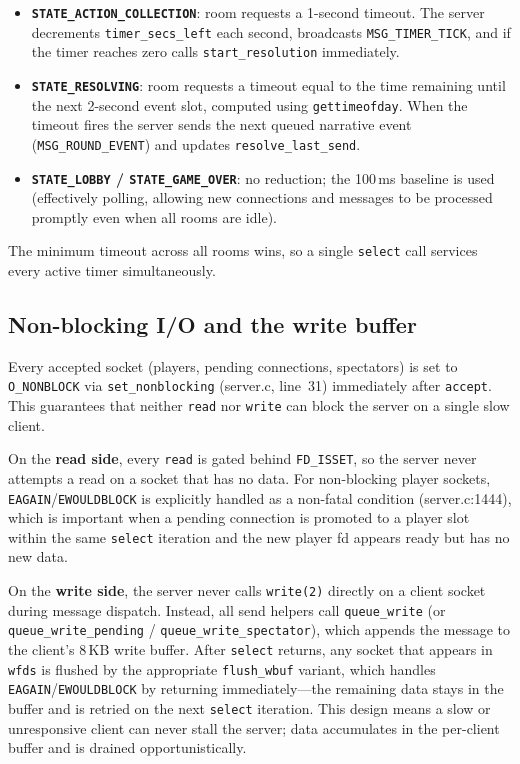 \documentclass[11pt,letterpaper]{article}
\begin{document}
\begin{itemize}[leftmargin=2em]
    \item \textbf{\texttt{STATE\_ACTION\_COLLECTION}}: room requests a 1-second timeout. The server decrements \texttt{timer\_secs\_left} each second, broadcasts \texttt{MSG\_TIMER\_TICK}, and if the timer reaches zero calls \texttt{start\_resolution} immediately.
    \item \textbf{\texttt{STATE\_RESOLVING}}: room requests a timeout equal to the time remaining until the next 2-second event slot, computed using \texttt{gettimeofday}. When the timeout fires the server sends the next queued narrative event (\texttt{MSG\_ROUND\_EVENT}) and updates \texttt{resolve\_last\_send}.
    \item \textbf{\texttt{STATE\_LOBBY} / \texttt{STATE\_GAME\_OVER}}: no reduction; the 100\,ms baseline is used (effectively polling, allowing new connections and messages to be processed promptly even when all rooms are idle).
\end{itemize}

The minimum timeout across all rooms wins, so a single \texttt{select} call services every active timer simultaneously.

\subsection*{Non-blocking I/O and the write buffer}

Every accepted socket (players, pending connections, spectators) is set to \texttt{O\_NONBLOCK} via \texttt{set\_nonblocking} (server.c, line~31) immediately after \texttt{accept}. This guarantees that neither \texttt{read} nor \texttt{write} can block the server on a single slow client.

On the \textbf{read side}, every \texttt{read} is gated behind \texttt{FD\_ISSET}, so the server never attempts a read on a socket that has no data. For non-blocking player sockets, \texttt{EAGAIN}/\texttt{EWOULDBLOCK} is explicitly handled as a non-fatal condition (server.c:1444), which is important when a pending connection is promoted to a player slot within the same \texttt{select} iteration and the new player fd appears ready but has no new data.

On the \textbf{write side}, the server never calls \texttt{write(2)} directly on a client socket during message dispatch. Instead, all send helpers call \texttt{queue\_write} (or \texttt{queue\_write\_pending} / \texttt{queue\_write\_spectator}), which appends the message to the client's 8\,KB write buffer. After \texttt{select} returns, any socket that appears in \texttt{wfds} is flushed by the appropriate \texttt{flush\_wbuf} variant, which handles \texttt{EAGAIN}/\texttt{EWOULDBLOCK} by returning immediately---the remaining data stays in the buffer and is retried on the next \texttt{select} iteration. This design means a slow or unresponsive client can never stall the server; data accumulates in the per-client buffer and is drained opportunistically.
\end{document}
